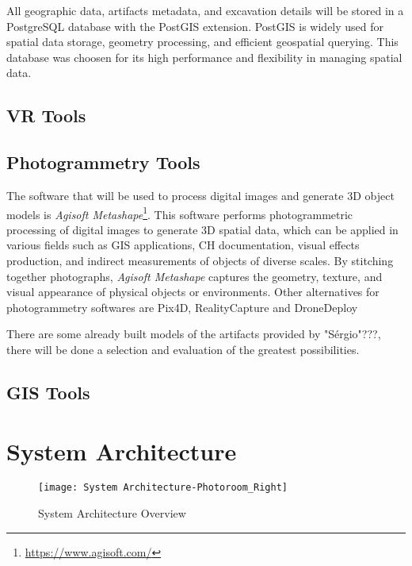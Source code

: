 All geographic data, artifacts metadata, and excavation details will be stored in a PostgreSQL database with the PostGIS extension. PostGIS is widely used for spatial data storage, geometry processing, and efficient geospatial querying. This database was choosen for its high performance and flexibility in managing spatial data.



\subsection{VR Tools}
\label{sec:vr_tools} 


\subsection{Photogrammetry Tools}
\label{sec:photogrammetry_tool} 

The software that will be used to process digital images and generate \gls{3D} object models is \textit{Agisoft Metashape}\footnote{\url{https://www.agisoft.com/}}.
This software performs photogrammetric processing of digital images to generate \gls{3D} spatial data, which can be applied in various fields such as \gls{GIS} applications, \gls{CH} documentation, visual effects production, and indirect measurements of objects of diverse scales. 
By stitching together photographs, \textit{Agisoft Metashape} captures the geometry, texture, and visual appearance of physical objects or environments.
Other alternatives for photogrammetry softwares are Pix4D, RealityCapture and DroneDeploy

There are some already built models of the artifacts provided by "Sérgio"???, there will be done a selection and evaluation of the greatest possibilities.

\subsection{GIS Tools}
\label{sec:gis} 


\section{System Architecture}
\label{sec:architecture}


\begin{figure}[h!]
    \centering
    \texttt{[image: System Architecture-Photoroom\_Right]}
    \caption{System Architecture Overview}
    \label{fig:architecture}
  \end{figure}
  \FloatBarrier


